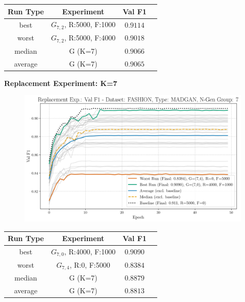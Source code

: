 \begin{table}[H]
	\vspace{-1em}
	\centering
	\begin{tabular}{|c|c|c|c|}
		\hline
		Run Type & Experiment & Val F1 \\ \hline
		best & \(G_{7, 2}\), R:5000, F:1000 & $0.9114$\\ \hline
		worst & \(G_{7, 2}\), R:5000, F:4000 & $0.9018$\\ \hline
		median & G (K=7) & $0.9066$\\ \hline
		average & G (K=7) & $0.9065$
		\\ \hline
	\end{tabular}
\end{table}
\noindent\textbf{Replacement Experiment: K=7}
\begin{figure}[htbp]
	\centering
	\includegraphics[width=.85\textwidth]{abb/strat_classifier_performance/FASHION_STRATIFIED_CLASSIFIERS_MADGAN_NEW/replacement_experiments/val_f1_score_MADGAN_FASHION_n_gen_7_all.png}
	\label{fig:app_strat_class_performance_replacement_exp._val_f1_score_7}
\end{figure}
\begin{table}[H]
	\vspace{-1em}
	\centering
	\begin{tabular}{|c|c|c|c|}
		\hline
		Run Type & Experiment & Val F1 \\ \hline
		best & \(G_{7, 0}\), R:4000, F:1000 & $0.9090$\\ \hline
		worst & \(G_{7, 4}\), R:0, F:5000 & $0.8384$\\ \hline
		median & G (K=7) & $0.8879$\\ \hline
		average & G (K=7) & $0.8813$
		\\ \hline
	\end{tabular}
\end{table}
